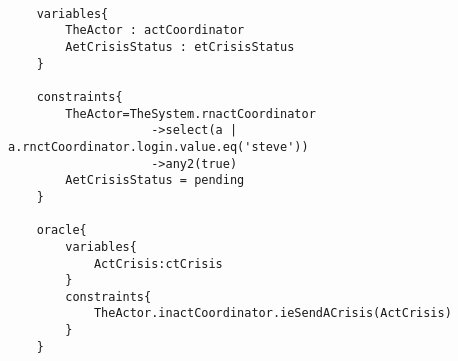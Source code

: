 	\scriptsize
	\vspace{0.5cm}
	\begin{lstlisting}[style=MessirStyle,firstnumber=auto,captionpos=b,caption={\msrmessir (MCL-oriented) specification of the test step \emph{testcase01-ts11oeGetCrisisSet}.},label=TM-testcase01-ts11oeGetCrisisSet-MCL-LST]

	variables{
		TheActor : actCoordinator
		AetCrisisStatus : etCrisisStatus
	}
	
	constraints{
		TheActor=TheSystem.rnactCoordinator
		            ->select(a | a.rnctCoordinator.login.value.eq('steve'))
		            ->any2(true)
		AetCrisisStatus = pending
	}
	
	oracle{
		variables{
			ActCrisis:ctCrisis
		}
		constraints{
			TheActor.inactCoordinator.ieSendACrisis(ActCrisis)
		}
	}
	
	\end{lstlisting}
	\normalsize 
	
	
